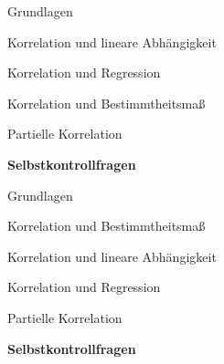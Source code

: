 \documentclass[
  8pt,
  ignorenonframetext,
]{beamer}
\begin{document}
\begin{frame}{}
\protect\hypertarget{section-8}{}
\vfill
\large

Grundlagen

Korrelation und lineare Abhängigkeit

Korrelation und Regression

Korrelation und Bestimmtheitsmaß

Partielle Korrelation

\textbf{Selbstkontrollfragen}

\vfill
\end{frame}

\begin{frame}{}
\protect\hypertarget{section-9}{}
\vfill
\large

Grundlagen

Korrelation und Bestimmtheitsmaß

Korrelation und lineare Abhängigkeit

Korrelation und Regression

Partielle Korrelation

\textbf{Selbstkontrollfragen}

\vfill
\end{frame}
\end{document}
